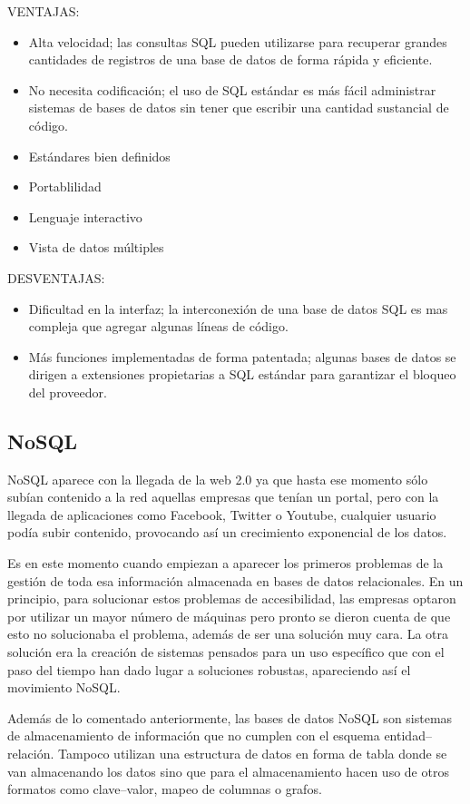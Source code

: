 \documentclass[%
 reprint,
 amsmath,amssymb,
 aps,
]{revtex4-1}
\begin{document}
   \par VENTAJAS:
\\
\begin{itemize}
		\item Alta velocidad; las consultas SQL pueden utilizarse para recuperar grandes cantidades de registros de una base de datos de forma rápida y eficiente.
		\item No necesita codificación; el uso de SQL estándar es más fácil administrar sistemas de bases de datos sin tener que escribir una cantidad sustancial de código.
		\item Estándares bien definidos
		\item Portablilidad
		\item Lenguaje interactivo
		\item Vista de datos múltiples
	\end{itemize}

   \par DESVENTAJAS:
\\                
\begin{itemize}
		\item Dificultad en la interfaz; la interconexión de una base de datos SQL es mas compleja que agregar algunas líneas de código.
		\item Más funciones implementadas de forma patentada; algunas bases de datos se dirigen a 
extensiones propietarias a SQL estándar para garantizar el bloqueo del proveedor.
	\end{itemize}


\subsection{NoSQL}
\par NoSQL aparece con la llegada de la web 2.0 ya que hasta ese momento sólo subían contenido a la red aquellas empresas que tenían un portal, pero con la llegada de aplicaciones como Facebook, Twitter o Youtube, cualquier usuario podía subir contenido, provocando así un crecimiento exponencial de los datos.

\par Es en este momento cuando empiezan a aparecer los primeros problemas de la gestión de toda esa información almacenada en bases de datos relacionales. En un principio, para solucionar estos problemas de accesibilidad, las empresas optaron por utilizar un mayor número de máquinas pero pronto se dieron cuenta de que esto no solucionaba el problema, además de ser una solución muy cara. La otra solución era la creación de sistemas pensados para un uso específico que con el paso del tiempo han dado lugar a soluciones robustas, apareciendo así el movimiento NoSQL. 
\par Además de lo comentado anteriormente, las bases de datos NoSQL son sistemas de almacenamiento de información que no cumplen con el esquema entidad–relación. Tampoco utilizan una estructura de datos en forma de tabla donde se van almacenando los datos sino que para el almacenamiento hacen uso de otros formatos como clave–valor, mapeo de columnas o grafos.
\end{document}
